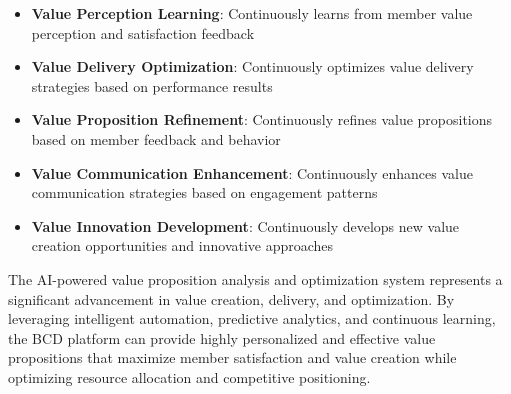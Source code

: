 \begin{itemize}
    \item \textbf{Value Perception Learning}: Continuously learns from member value perception and satisfaction feedback
    \item \textbf{Value Delivery Optimization}: Continuously optimizes value delivery strategies based on performance results
    \item \textbf{Value Proposition Refinement}: Continuously refines value propositions based on member feedback and behavior
    \item \textbf{Value Communication Enhancement}: Continuously enhances value communication strategies based on engagement patterns
    \item \textbf{Value Innovation Development}: Continuously develops new value creation opportunities and innovative approaches
\end{itemize}

The AI-powered value proposition analysis and optimization system represents a significant advancement in value creation, delivery, and optimization. By leveraging intelligent automation, predictive analytics, and continuous learning, the BCD platform can provide highly personalized and effective value propositions that maximize member satisfaction and value creation while optimizing resource allocation and competitive positioning. 